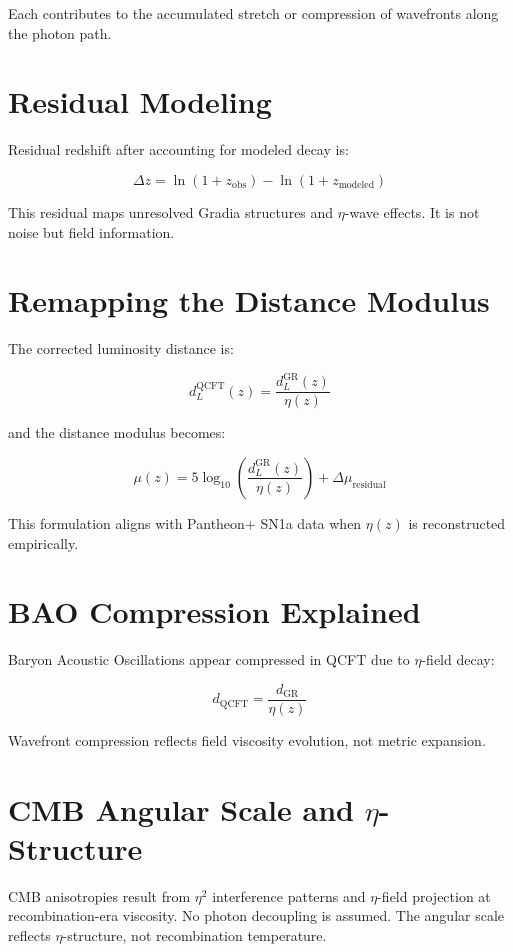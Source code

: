 \documentclass[12pt]{article}
\begin{document}
Each contributes to the accumulated stretch or compression of wavefronts along the photon path.

\section{Residual Modeling}

Residual redshift after accounting for modeled decay is:

\[
\Delta z = \ln(1 + z_{\text{obs}}) - \ln(1 + z_{\text{modeled}})
\]

This residual maps unresolved Gradia structures and $\eta$-wave effects. It is not noise but field information.

\section{Remapping the Distance Modulus}

The corrected luminosity distance is:

\[
d_L^{\text{QCFT}}(z) = \frac{d_L^{\text{GR}}(z)}{\eta(z)}
\]

and the distance modulus becomes:

\[
\mu(z) = 5 \log_{10} \left( \frac{d_L^{\text{GR}}(z)}{\eta(z)} \right) + \Delta \mu_{\text{residual}}
\]

This formulation aligns with Pantheon+ SN1a data when $\eta(z)$ is reconstructed empirically.

\section{BAO Compression Explained}

Baryon Acoustic Oscillations appear compressed in QCFT due to $\eta$-field decay:

\[
d_{\text{QCFT}} = \frac{d_{\text{GR}}}{\eta(z)}
\]

Wavefront compression reflects field viscosity evolution, not metric expansion.

\section{CMB Angular Scale and $\eta$-Structure}

CMB anisotropies result from $\eta^2$ interference patterns and $\eta$-field projection at recombination-era viscosity. No photon decoupling is assumed. The angular scale reflects $\eta$-structure, not recombination temperature.
\end{document}
